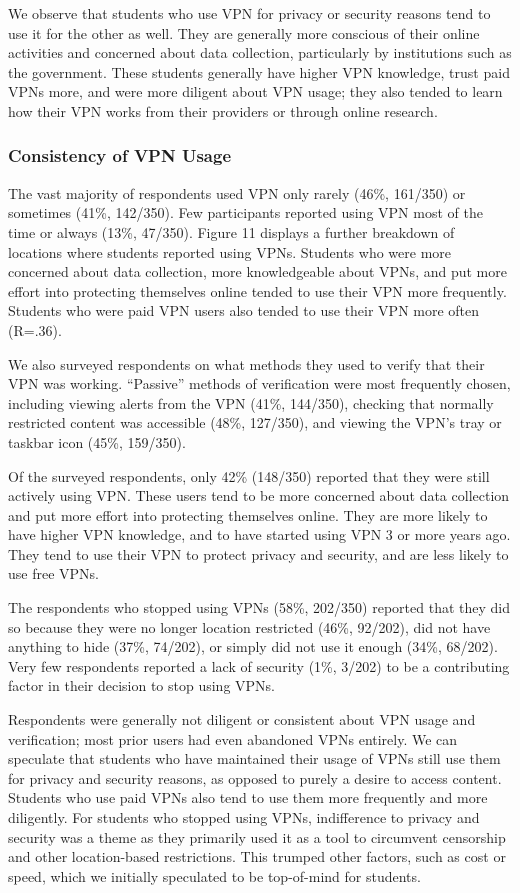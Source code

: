 We observe that students who use VPN for privacy or security reasons tend to
use it for the other as well. They are generally more conscious of their
online activities and concerned about data collection, particularly by
institutions such as the government. These students generally have higher VPN
knowledge, trust paid VPNs more, and were more diligent about VPN usage; they
also tended to learn how their VPN works from their providers or through
online research.

\subsubsection{Consistency of VPN Usage}

The vast majority of respondents used VPN only rarely (46\%, 161/350) or
sometimes (41\%, 142/350). Few participants reported using VPN most of the
time or always (13\%, 47/350). Figure 11 displays a further breakdown of
locations where students reported using VPNs. Students who were more concerned
about data collection, more knowledgeable about VPNs, and put more effort into
protecting themselves online tended to use their VPN more frequently. Students
who were paid VPN users also tended to use their VPN more often (R=.36).

We also surveyed respondents on what methods they used to verify that their
VPN was working. “Passive” methods of verification were most frequently
chosen, including viewing alerts from the VPN (41\%, 144/350), checking that
normally restricted content was accessible (48\%, 127/350), and viewing the
VPN’s tray or taskbar icon (45\%, 159/350).

Of the surveyed respondents, only 42\% (148/350) reported that they were still
actively using VPN. These users tend to be more concerned about data
collection and put more effort into protecting themselves online. They are
more likely to have higher VPN knowledge, and to have started using VPN 3 or
more years ago. They tend to use their VPN to protect privacy and security,
and are less likely to use free VPNs.

The respondents who stopped using VPNs (58\%, 202/350) reported that they did
so because they were no longer location restricted (46\%, 92/202), did not
have anything to hide (37\%, 74/202), or simply did not use it enough (34\%,
68/202). Very few respondents reported a lack of security (1\%, 3/202) to be a
contributing factor in their decision to stop using VPNs.

Respondents were generally not diligent or consistent about VPN usage and
verification; most prior users had even abandoned VPNs entirely. We can
speculate that students who have maintained their usage of VPNs still use them
for privacy and security reasons, as opposed to purely a desire to access
content. Students who use paid VPNs also tend to use them more frequently and
more diligently. For students who stopped using VPNs, indifference to privacy
and security was a theme as they primarily used it as a tool to circumvent
censorship and other location-based restrictions. This trumped other factors,
such as cost or speed, which we initially speculated to be top-of-mind for
students.


